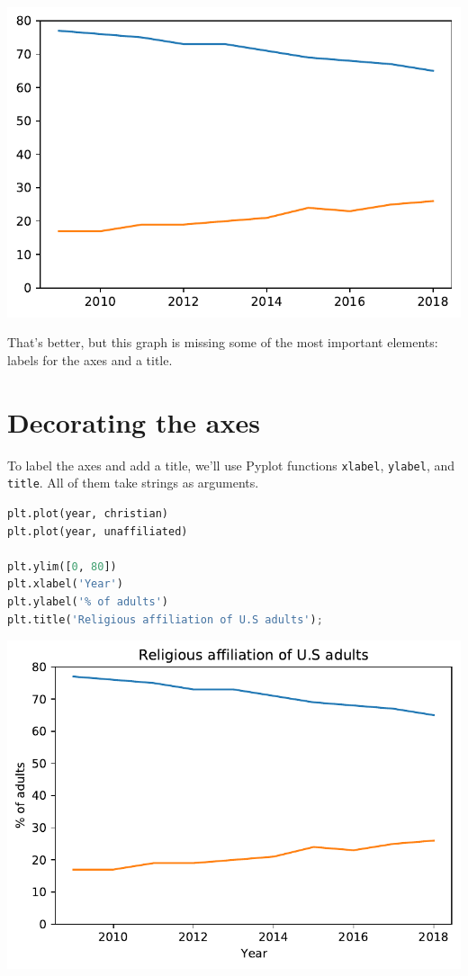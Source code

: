 \begin{center}
\includegraphics[scale=0.75]{chapters/06_plotting_files/06_plotting_29_0.pdf}
\end{center}

That's better, but this graph is missing some of the most important
elements: labels for the axes and a title.

\hypertarget{decorating-the-axes}{%
\section{Decorating the axes}\label{decorating-the-axes}}

To label the axes and add a title, we'll use Pyplot functions
\passthrough{\lstinline!xlabel!}, \passthrough{\lstinline!ylabel!}, and
\passthrough{\lstinline!title!}. All of them take strings as arguments.

\begin{lstlisting}[language=Python]
plt.plot(year, christian)
plt.plot(year, unaffiliated)

plt.ylim([0, 80])
plt.xlabel('Year')
plt.ylabel('% of adults')
plt.title('Religious affiliation of U.S adults');
\end{lstlisting}

\begin{center}
\includegraphics[scale=0.75]{chapters/06_plotting_files/06_plotting_32_0.pdf}
\end{center}

